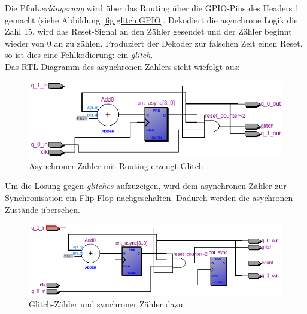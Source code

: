Die Pfad\textit{verlängerung} wird über das Routing über die GPIO-Pins des Headers 1 gemacht (siehe Abbildung \ref{fig.glitch.GPIO}. Dekodiert die asynchrone Logik die Zahl 15, wird das  Reset-Signal an den Zähler gesendet und der Zähler beginnt wieder von 0 an zu zählen. Produziert der Dekoder zur falschen Zeit einen Reset, so ist dies eine Fehlkodierung: ein \textit{glitch}.\\

Das RTL-Diagramm des asynchronen Zählers sieht wiefolgt aus:
\begin{figure}[H]
	\includegraphics[width=1\textwidth]{images/glitch/RTL_asynchron.png}
	\caption{Asynchroner Zähler mit Routing erzeugt Glitch}
	\label{fig.glitch.RTL_nurGlitch}
\end{figure}

Um die Lösung gegen \textit{glitches} aufzuzeigen, wird dem asynchronen Zähler zur Synchronisation ein Flip-Flop nachgeschalten. Dadurch werden die asychronen Zustände übersehen. 
\begin{figure}[H]
	\includegraphics[width=\textwidth]{images/glitch/glitch_asynch_new.png}
	\caption{Glitch-Zähler und synchroner Zähler dazu}
	\label{fig.glitch.RTL_mit_synchr.Zaehler}
\end{figure}

